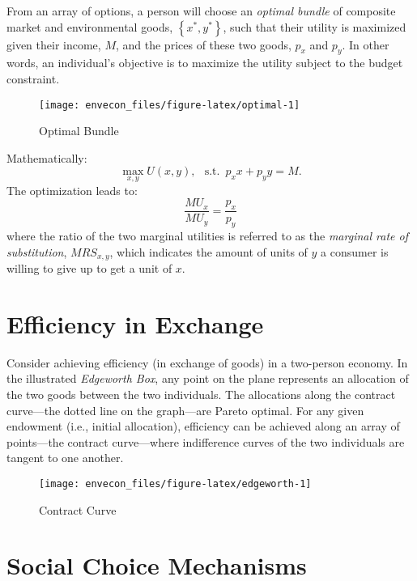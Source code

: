 \documentclass[
]{book}
\begin{document}
From an array of options, a person will choose an \emph{optimal bundle} of composite market and environmental goods, \(\left\{x^*,y^*\right\}\), such that their utility is maximized given their income, \(M\), and the prices of these two goods, \(p_x\) and \(p_y\). In other words, an individual's objective is to maximize the utility subject to the budget constraint.

\begin{figure}

{\centering \texttt{[image: envecon\_files/figure-latex/optimal-1]} 

}

\caption{Optimal Bundle}\label{fig:optimal}
\end{figure}

Mathematically: \[\max_{x,y}U(x,y),\;~~\mbox{s.t.}\;~p_{x}x+p_{y}y=M.\] The optimization leads to: \[\frac{MU_x}{MU_y} = \frac{p_x}{p_y}\] where the ratio of the two marginal utilities is referred to as the \emph{marginal rate of substitution}, \(MRS_{x,y}\), which indicates the amount of units of \(y\) a consumer is willing to give up to get a unit of \(x\).

\hypertarget{efficiency-in-exchange}{%
\section{Efficiency in Exchange}\label{efficiency-in-exchange}}

Consider achieving efficiency (in exchange of goods) in a two-person economy. In the illustrated \emph{Edgeworth Box}, any point on the plane represents an allocation of the two goods between the two individuals. The allocations along the contract curve---the dotted line on the graph---are Pareto optimal. For any given endowment (i.e., initial allocation), efficiency can be achieved along an array of points---the contract curve---where indifference curves of the two individuals are tangent to one another.

\begin{figure}

{\centering \texttt{[image: envecon\_files/figure-latex/edgeworth-1]} 

}

\caption{Contract Curve}\label{fig:edgeworth}
\end{figure}

\hypertarget{social-choice-mechanisms}{%
\section{Social Choice Mechanisms}\label{social-choice-mechanisms}}
\end{document}
